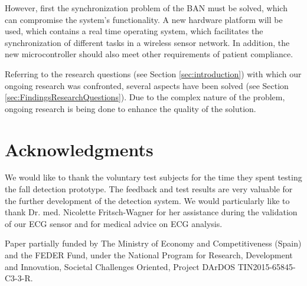 \documentclass[10pt,journal,compsoc]{IEEEtran}
\begin{document}
However, first the synchronization problem of the BAN must be solved, which can compromise the system's functionality. A new hardware platform will be used, which contains a real time operating system, which facilitates the synchronization of different tasks in a wireless sensor network. In addition, the new microcontroller should also meet other requirements of patient compliance.

Referring to the research questions (see Section \ref{sec:introduction}) with which our ongoing research was confronted, several aspects have been solved (see Section \ref{sec:FindingsResearchQuestions}). Due to the complex nature of the problem, ongoing research is being done to enhance the quality of the solution.

\section*{Acknowledgments}
We would like to thank the voluntary test subjects for the time they spent testing the fall detection prototype. The feedback and test results are very valuable for the further development of the detection system. We would particularly like to thank Dr. med. Nicolette Fritsch-Wagner for her assistance during the validation of our ECG sensor and for medical advice on ECG analysis. 

Paper partially funded by The Ministry of Economy and Competitiveness (Spain) and the FEDER Fund, under the National Program for Research, Development and Innovation, Societal Challenges Oriented, Project DArDOS TIN2015-65845-C3-3-R.


%
%
\end{document}
